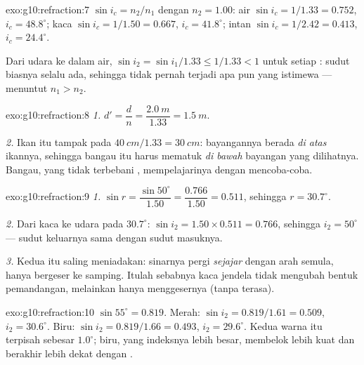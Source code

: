 \begin{solution}{exo:g10:refraction:7}
$\sin i_c = n_2/n_1$ dengan $n_2 = 1.00$:
air $\sin i_c = 1/1.33 = 0.752$, $i_c = 48.8^\circ$;
kaca $\sin i_c = 1/1.50 = 0.667$, $i_c = 41.8^\circ$;
intan $\sin i_c = 1/2.42 = 0.413$, $i_c = 24.4^\circ$.

Dari udara ke dalam air, $\sin i_2 = \sin i_1/1.33 \leq 1/1.33 < 1$
untuk setiap : sudut biasnya selalu ada, sehingga tidak
pernah terjadi apa pun yang istimewa ---  menuntut
$n_1 > n_2$.
\end{solution}

\begin{solution}{exo:g10:refraction:8}
\emph{1.} $d' = \dfrac{d}{n} = \dfrac{\qty{2.0}{m}}{1.33}
= \qty{1.5}{m}$.

\emph{2.} Ikan itu tampak pada $\qty{40}{cm}/1.33 = \qty{30}{cm}$:
bayangannya berada \emph{di atas} ikannya, sehingga bangau itu harus
mematuk \emph{di bawah} bayangan yang dilihatnya. Bangau, yang tidak
terbebani , mempelajarinya dengan mencoba-coba.
\end{solution}

\begin{solution}{exo:g10:refraction:9}
\emph{1.} $\sin r = \dfrac{\sin 50^\circ}{1.50} = \dfrac{0.766}{1.50}
= 0.511$, sehingga $r = 30.7^\circ$.

\emph{2.} Dari kaca ke udara pada $30.7^\circ$:
$\sin i_2 = 1.50 \times 0.511 = 0.766$, sehingga $i_2 = 50^\circ$ ---
sudut keluarnya sama dengan sudut masuknya.

\emph{3.} Kedua  itu saling meniadakan: sinarnya pergi
\emph{sejajar} dengan arah semula, hanya bergeser ke samping. Itulah
sebabnya kaca jendela tidak mengubah bentuk pemandangan, melainkan
hanya menggesernya (tanpa terasa).
\end{solution}

\begin{solution}{exo:g10:refraction:10}
$\sin 55^\circ = 0.819$. Merah:
$\sin i_2 = 0.819/1.61 = 0.509$, $i_2 = 30.6^\circ$. Biru:
$\sin i_2 = 0.819/1.66 = 0.493$, $i_2 = 29.6^\circ$. Kedua warna itu
terpisah sebesar $1.0^\circ$; biru, yang indeksnya lebih besar,
membelok lebih kuat dan berakhir lebih dekat dengan .
\end{solution}

